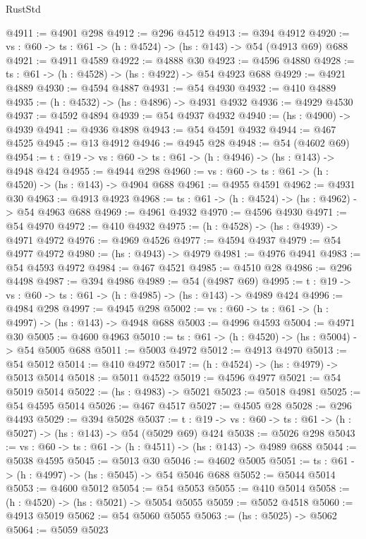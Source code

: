 \begin{lexlean}{RustStd}
\begin{coremodule}
{\begin{coremodule}
{{{{{{{{@4911 := @4901 @298
@4912 := @296 @4512
@4913 := @394 @4912
@4920 := {vs : @60} -> {ts : @61} -> (h : @4524) -> (hs : @143) -> @54 (@4913 @69) @688
@4921 := @4911 @4589
@4922 := @4888 @30
@4923 := @4596 @4880
@4928 := {ts : @61} -> (h : @4528) -> (hs : @4922) -> @54 @4923 @688
@4929 := @4921 @4889
@4930 := @4594 @4887
@4931 := @54 @4930
@4932 := @410 @4889
@4935 := (h : @4532) -> (hs : @4896) -> @4931 @4932
@4936 := @4929 @4530
@4937 := @4592 @4894
@4939 := @54 @4937 @4932
@4940 := (hs : @4900) -> @4939
@4941 := @4936 @4898
@4943 := @54 @4591 @4932
@4944 := @467 @4525
@4945 := @13 @4912
@4946 := @4945 @28
@4948 := @54 (@4602 @69)
@4954 := {t : @19} -> {vs : @60} -> {ts : @61} -> (h : @4946) -> (hs : @143) -> @4948 @424
@4955 := @4944 @298
@4960 := {vs : @60} -> {ts : @61} -> (h : @4520) -> (hs : @143) -> @4904 @688
@4961 := @4955 @4591
@4962 := @4931 @30
@4963 := @4913 @4923
@4968 := {ts : @61} -> (h : @4524) -> (hs : @4962) -> @54 @4963 @688
@4969 := @4961 @4932
@4970 := @4596 @4930
@4971 := @54 @4970
@4972 := @410 @4932
@4975 := (h : @4528) -> (hs : @4939) -> @4971 @4972
@4976 := @4969 @4526
@4977 := @4594 @4937
@4979 := @54 @4977 @4972
@4980 := (hs : @4943) -> @4979
@4981 := @4976 @4941
@4983 := @54 @4593 @4972
@4984 := @467 @4521
@4985 := @4510 @28
@4986 := @296 @4498
@4987 := @394 @4986
@4989 := @54 (@4987 @69)
@4995 := {t : @19} -> {vs : @60} -> {ts : @61} -> (h : @4985) -> (hs : @143) -> @4989 @424
@4996 := @4984 @298
@4997 := @4945 @298
@5002 := {vs : @60} -> {ts : @61} -> (h : @4997) -> (hs : @143) -> @4948 @688
@5003 := @4996 @4593
@5004 := @4971 @30
@5005 := @4600 @4963
@5010 := {ts : @61} -> (h : @4520) -> (hs : @5004) -> @54 @5005 @688
@5011 := @5003 @4972
@5012 := @4913 @4970
@5013 := @54 @5012
@5014 := @410 @4972
@5017 := (h : @4524) -> (hs : @4979) -> @5013 @5014
@5018 := @5011 @4522
@5019 := @4596 @4977
@5021 := @54 @5019 @5014
@5022 := (hs : @4983) -> @5021
@5023 := @5018 @4981
@5025 := @54 @4595 @5014
@5026 := @467 @4517
@5027 := @4505 @28
@5028 := @296 @4493
@5029 := @394 @5028
@5037 := {t : @19} -> {vs : @60} -> {ts : @61} -> (h : @5027) -> (hs : @143) -> @54 (@5029 @69) @424
@5038 := @5026 @298
@5043 := {vs : @60} -> {ts : @61} -> (h : @4511) -> (hs : @143) -> @4989 @688
@5044 := @5038 @4595
@5045 := @5013 @30
@5046 := @4602 @5005
@5051 := {ts : @61} -> (h : @4997) -> (hs : @5045) -> @54 @5046 @688
@5052 := @5044 @5014
@5053 := @4600 @5012
@5054 := @54 @5053
@5055 := @410 @5014
@5058 := (h : @4520) -> (hs : @5021) -> @5054 @5055
@5059 := @5052 @4518
@5060 := @4913 @5019
@5062 := @54 @5060 @5055
@5063 := (hs : @5025) -> @5062
@5064 := @5059 @5023
}}}}}}}}
\end{coremodule}}
\end{coremodule}
\end{lexlean}
